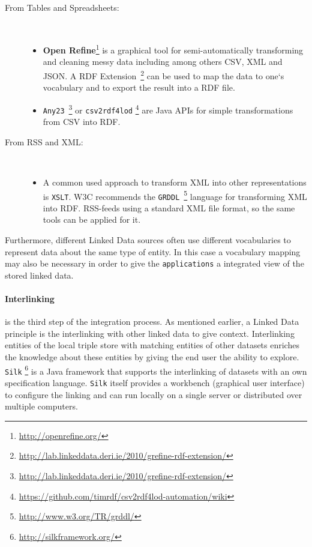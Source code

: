 \documentclass{article}
\begin{document}
\begin{description}
 	\item[\small From Tables and Spreadsheets:] $ $
 	\begin{itemize}
 		\item \textbf{Open Refine}\footnote{\url{http://openrefine.org/}} is a graphical tool for semi-automatically transforming and cleaning messy data including among others CSV, XML and JSON. A RDF Extension~\footnote{\url{http://lab.linkeddata.deri.ie/2010/grefine-rdf-extension/}} can be used to map the data to one`s vocabulary and to export the result into a RDF file.
 		\item \texttt{Any23}~\footnote{\url{http://lab.linkeddata.deri.ie/2010/grefine-rdf-extension/}} or  \texttt{csv2rdf4lod} \footnote{\url{https://github.com/timrdf/csv2rdf4lod-automation/wiki}} are Java APIs for simple transformations from CSV into RDF.
	\end{itemize}
	\item[\small From RSS and XML:] $ $
	\begin{itemize}
		\item A common used approach to transform XML into other representations is \texttt{XSLT}. W3C recommends the \texttt{GRDDL}~\footnote{\url{http://www.w3.org/TR/grddl/}} language for transforming XML into RDF. RSS-feeds using a standard XML file format, so the same tools can be applied for it.
	\end{itemize}
\end{description}

Furthermore, different Linked Data sources often use different vocabularies to represent data about the same type of entity.\cite{berners-lee_fractal_2008} In this case a vocabulary mapping may also be necessary in order to give the \texttt{applications} a integrated view of the stored linked data. 

\paragraph{Interlinking} is the third step of the integration process. As mentioned earlier, a Linked Data principle is the interlinking with other linked data to give context. Interlinking entities of the local triple store with matching entities of other datasets enriches the knowledge about these entities by giving the end user the ability to explore. \texttt{Silk} \footnote{\url{http://silkframework.org/}} is a Java framework that supports the interlinking of datasets with an own specification language. \texttt{Silk} itself provides a workbench (graphical user interface) to configure the linking and can run locally on a single server or distributed over multiple computers.  
\end{document}
